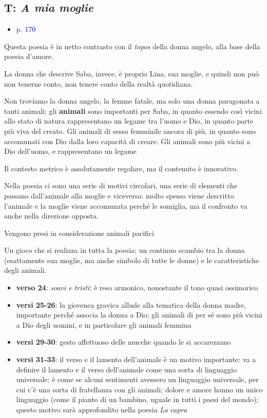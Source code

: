 \documentclass[a4paper, twoside, titlepage]{book}
\newcommand{\elenco}[1]{%
\begin{itemize}
#1
\end{itemize}}
\renewcommand{\emph}[1]{\textcolor{blue}{#1}}
\begin{document}
\subsection{T: \textit{A mia moglie}}
\elenco{\item \emph{p. 170}}

Questa poesia è in netto contrasto con il \textit{topos} della donna angelo, alla base della poesia d'amore.

La donna che descrive Saba, invece, è proprio Lina, sua moglie, e quindi non può non tenerne conto, non tenere conto della realtà quotidiana.

Non troviamo la donna angelo, la femme fatale, ma solo una donna paragonata a tanti animali; gli \textbf{animali} sono importanti per Saba, in quanto essendo così vicini allo stato di natura rappresentano un legame tra l'uomo e Dio, in quanto parte più viva del creato. Gli animali di sesso femminile ancora di più, in quanto sono accomunati con Dio dalla loro capacità di creare.
Gli animali sono più vicini a Dio dell'uomo, e rappresentano un legame

Il contesto metrico è assolutamente regolare, ma il contenuto è innovativo.

Nella poesia ci sono una serie di motivi circolari, una serie di elementi che passano dall'animale alla moglie e viceversa: molto spesso viene descritto l'animale e la moglie viene accomunata perché le somiglia, ma il confronto va anche nella direzione opposta.

Vengono presi in considerazione animali pacifici

Un gioco che si realizza in tutta la poesia: un continuo scambio tra la donna (esattamente sua moglie, ma anche simbolo di tutte le donne) e le caratteristiche degli animali.

\elenco{
	\item \textbf{verso 24}: \textit{soavi e tristi}: è reso armonico, nonostante il tono quasi ossimorico
	\item \textbf{versi 25-26}: la giovenca gravica allude alla tematica della donna madre, importante perché associa la donna a Dio; gli animali di per sé sono più vicini a Dio degli uomini, e in particolare gli animali femmina
	\item \textbf{versi 29-30}: gesto affettuoso delle mucche quando le si accarezzano
	\item \textbf{versi 31-33}: il verso e il lamento dell'animale è un motivo importante: va a definire il lamento e il verso dell'animale come una sorta di linguaggio universale: è come se alcuni sentimenti avessero un linguaggio universale, per cui c'è una sorta di fratellanza con gli animali; dolore e amore hanno un unico linguaggio (come il pianto di un bambino, uguale in tutti i paesi del mondo); questo motivo sarà approfondito nella poesia \textit{La capra}}
\end{document}
